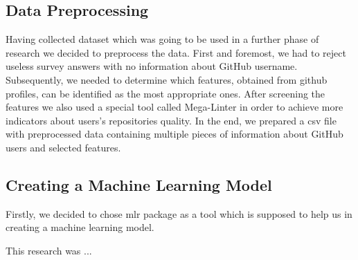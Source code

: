 \documentclass[graybox]{svmult}
\begin{document}
\subsection{Data Preprocessing}
Having collected dataset which was going to be used in a further phase of research we decided to preprocess the data. First and foremost,  we had to reject useless survey answers with no information about GitHub username. Subsequently, we needed to determine which features, obtained from github profiles, can be identified as the most appropriate ones.  After screening the features we also used a special tool called Mega-Linter in order to achieve more indicators about users’s repositories quality. In the end, we prepared a csv file with preprocessed data containing multiple pieces of information about GitHub users and selected features.
\subsection{Creating a Machine Learning Model}
Firstly, we decided to chose mlr package as a tool which is supposed to help us in creating a machine learning model.


%

%

%

%

\begin{acknowledgement}

This research was ...
\end{acknowledgement}




%
\end{document}
